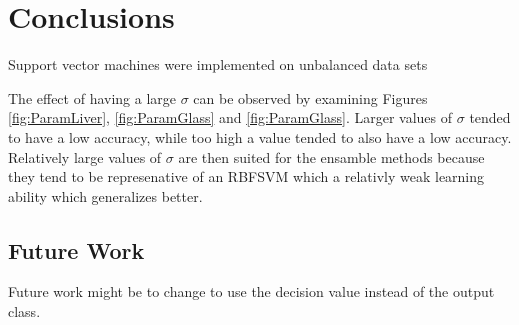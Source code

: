 \section{Conclusions}
\label{sec:Conclusions}

Support vector machines were implemented on unbalanced data sets

The effect of having a large $\sigma$ can be observed by examining Figures \ref{fig:ParamLiver}, \ref{fig:ParamGlass} and \ref{fig:ParamGlass}.
Larger values of $\sigma$ tended to have a low accuracy, while too high a value tended to also have a low accuracy. 
Relatively large values of $\sigma$ are then suited for the ensamble methods because they tend to be represenative of an RBFSVM which a relativly weak learning ability which generalizes better.
\subsection{Future Work}
Future work might be to change to use the decision value instead of the output class.
